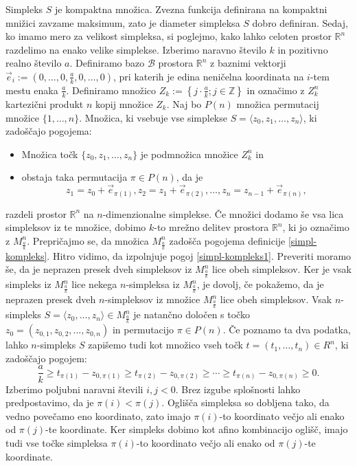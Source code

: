 \documentclass[mat1]{fmfdelo}
\newcommand{\R}{\mathbb R}
\newcommand{\Z}{\mathbb Z}
\newcommand{\0}{0}
\newcommand{\pB}{\mathcal B}
\begin{document}
Simpleks $S$ je kompaktna množica. Zvezna funkcija definirana na kompaktni mnižici zavzame maksimum, zato je diameter simpleksa $S$ dobro definiran.
Sedaj, ko imamo mero za velikost simpleksa, si poglejmo, kako lahko celoten prostor $\R^n$ razdelimo na enako velike simplekse. Izberimo naravno število $k$ in pozitivno realno število $a$. Definiramo bazo $\pB$ prostora $\R^n$ z baznimi vektorji $\vec{e}_i := (0, \dots, 0, \frac{a}{k}, 0, \dots, 0)$, pri katerih je edina neničelna koordinata na $i$-tem mestu enaka $\frac{a}{k}$. Definiramo množico $Z_k := \left\{ j \cdot \frac{a}{k}; j \in \Z \right\}$ in označimo z $Z_k^n$ kartezični produkt $n$ kopij množice $Z_k$. Naj bo $P(n)$ množica permutacij množice $\{1, \dots, n \}$.
Množica, ki vsebuje vse simplekse $S = \langle z_0, z_1, \dots, z_n \rangle$, ki zadoščajo pogojema:
\begin{itemize}
\item Množica točk $\{ z_0, z_1, \dots, z_n \}$ je podmnožica množice $Z_k^n$ in
\item obstaja taka permutacija $\pi \in P(n)$, da je 
\begin{equation*}
z_1 = z_0 + \vec{e}_{\pi(1)}, z_2 = z_1 + \vec{e}_{\pi(2)}, \dots, z_n = z_{n-1} + \vec{e}_{\pi(n)},
\end{equation*}
\end{itemize}
razdeli prostor $\R^n$ na $n$-dimenzionalne simplekse.
Če množici dodamo še vsa lica simpleksov iz te množice, dobimo $k$-to mrežno delitev prostora $\R^n$, ki jo označimo z $M_{\frac{a}{k}}^n$.
Prepričajmo se, da množica $M_{\frac{a}{k}}^n$ zadošča pogojema definicije \ref{simpl-kompleks}. Hitro vidimo, da izpolnjuje pogoj \eqref{simpl-kompleks1}. Preveriti moramo še, da je neprazen presek dveh simpleksov iz $M_{\frac{a}{k}}^n$ lice obeh simpleksov. Ker je vsak simpleks iz $M_{\frac{a}{k}}^n$ lice nekega $n$-simpleksa iz $M_{\frac{a}{k}}^n$, je dovolj, če pokažemo, da je neprazen presek dveh $n$-simpleksov iz množice $M_{\frac{a}{k}}^n$ lice obeh simpleksov. Vsak $n$-simpleks $S = \langle z_0, \dots, z_n \rangle \in  M_{\frac{a}{k}}^n$ je natančno določen s točko $z_0 = (z_{0,1}, z_{0, 2}, \dots, z_{0,n})$ in permutacijo $\pi \in P(n)$. Če poznamo ta dva podatka, lahko $n$-simpleks $S$ zapišemo tudi kot množico vseh točk $t=(t_1, \dots, t_n) \in R^n$, ki zadoščajo pogojem:
$$\frac{a}{k} \geq t_{\pi(1)} - z_{0, \pi(1)}  \geq t_{\pi(2)} - z_{0, \pi(2)} \geq \cdots \geq t_{\pi(n)} - z_{0, \pi(n)} \geq 0.$$
Izberimo poljubni naravni števili $i, j < 0$. Brez izgube splošnosti lahko predpostavimo, da je $\pi(i) < \pi(j)$. Oglišča simpleksa so dobljena tako, da vedno povečamo eno koordinato, zato imajo $\pi(i)$-to koordinato večjo ali enako od $\pi(j)$-te koordinate. Ker simpleks dobimo kot afino kombinacijo oglišč, imajo tudi vse točke simpleksa $\pi(i)$-to koordinato večjo ali enako od $\pi(j)$-te koordinate.
\end{document}

